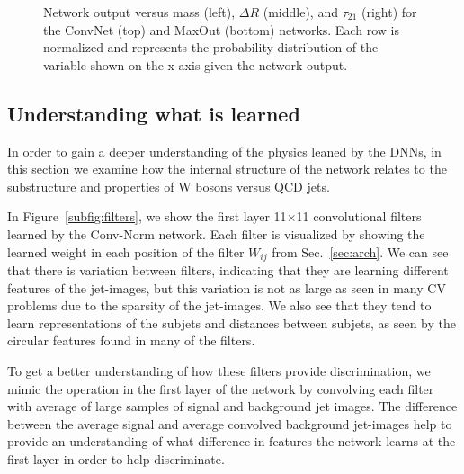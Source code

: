 \begin{figure}[htbp!]
\begin{center}
      \caption{Network output versus mass (left), $\Delta R$ (middle), and $\tau_{21}$ (right) for the ConvNet (top) and MaxOut (bottom) networks.  Each row is normalized and represents the probability distribution of the variable shown on the x-axis given the network output.}
      \label{fig:qcdsculpt}

    \end{center}
\end{figure}

\subsection{Understanding what is learned} %
\label{ssub:understanding_what_is_learned}

In order to gain a deeper understanding of the physics leaned by the DNNs, in this section we examine how the internal structure of the network relates to the substructure and properties of W bosons versus QCD jets.



In Figure~\ref{subfig:filters}, we show the first layer 11$\times$11 convolutional filters learned by the Conv-Norm network. Each filter is visualized by showing the learned weight in each position of the filter $W_{ij}$ from Sec.~\ref{sec:arch}.  We can see that there is variation between filters, indicating that they are learning different features of the jet-images, but this variation is not as large as seen in many CV problems due to the sparsity of the jet-images.  We also see that they tend to learn representations of the subjets and distances between subjets, as seen by the circular features found in many of the filters.

To get a better understanding of how these filters provide discrimination, we mimic the operation in the first layer of the network by convolving each filter with average of large samples of signal and background jet images.  The difference between the average signal and average convolved background jet-images help to provide an understanding of what difference in features the network learns at the first layer in order to help discriminate.

